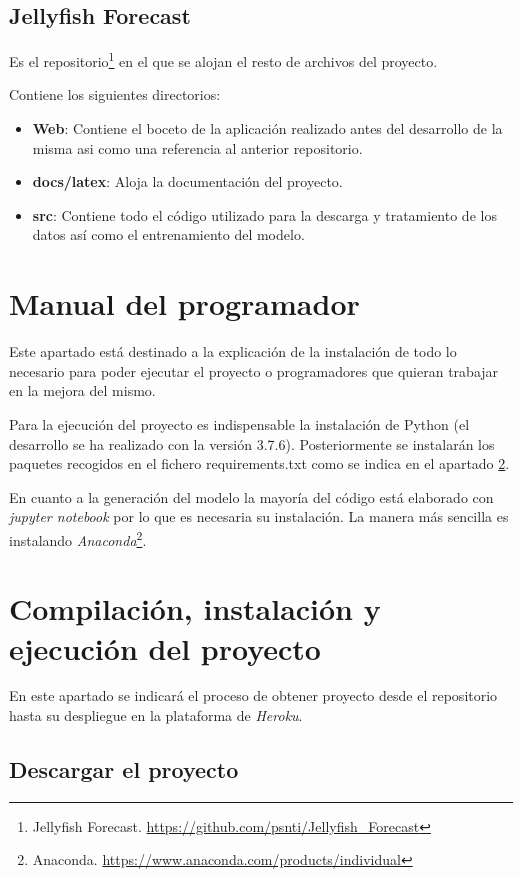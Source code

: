 \subsection{Jellyfish Forecast}
Es el repositorio\footnote{Jellyfish Forecast. \url{https://github.com/psnti/Jellyfish_Forecast}} en el que se alojan el resto de archivos del proyecto.

Contiene los siguientes directorios:
\begin{itemize}
	\item \textbf{Web}: Contiene el boceto de la aplicación realizado antes del desarrollo de la misma asi como una referencia al anterior repositorio.
	\item \textbf{docs/latex}: Aloja la documentación del proyecto.
	\item \textbf{src}: Contiene todo el código utilizado para la descarga y tratamiento de los datos así como el entrenamiento del modelo.
\end{itemize}

\section{Manual del programador}

Este apartado está destinado a la explicación de la instalación de todo lo necesario para poder ejecutar el proyecto o programadores que quieran trabajar en la mejora del mismo.

Para la ejecución del proyecto es indispensable la instalación de Python (el desarrollo se ha realizado con la versión 3.7.6). Posteriormente se instalarán los paquetes recogidos en el fichero requirements.txt como se indica en el apartado \ref{D4}.

En cuanto a la generación del modelo la mayoría del código está elaborado con \emph{jupyter notebook} por lo que es necesaria su instalación. La manera más sencilla es instalando \emph{Anaconda}\footnote{Anaconda. \url{https://www.anaconda.com/products/individual}}.

\section{Compilación, instalación y ejecución del proyecto}\label{D4}

En este apartado se indicará el proceso de obtener proyecto desde el repositorio hasta su despliegue en la plataforma de \emph{Heroku}.

\subsection{Descargar el proyecto}\label{Descarga}

